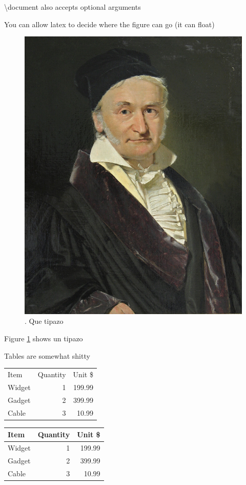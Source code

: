 \documentclass{article}
\begin{document}
\textbackslash document also accepts optional arguments

You can allow latex to decide where the figure can go (it can float)

\begin{figure}
\centering
    \includegraphics[width=.5\textwidth]{gauss.jpeg}
\caption{\label{fig:gauss}. Que tipazo}
\end{figure}

Figure \ref{fig:gauss} shows un tipazo

Tables are somewhat shitty

\begin{tabular}{lrr} %
Item    & Quantity  & Unit \$   \\
Widget  & 1         & 199.99    \\
Gadget  & 2         & 399.99    \\
Cable   & 3         & 10.99     \\
\end{tabular}

\begin{tabular}{|l|r|r|} \hline %
Item    & Quantity  & Unit \$   \\\hline
Widget  & 1         & 199.99    \\
Gadget  & 2         & 399.99    \\
Cable   & 3         & 10.99     \\\hline
\end{tabular}
\end{document}
